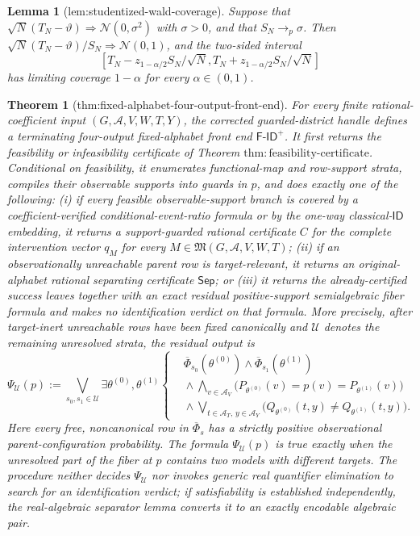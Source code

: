 \documentclass{article}
\newtheorem{theorem}{Theorem}
\newtheorem{lemma}{Lemma}
\begin{document}
\begin{lemma}[lem:studentized-wald-coverage]\label{lem:studentized-wald-coverage}
Suppose that
\(\sqrt N(T_N-\vartheta)\Rightarrow\mathcal N(0,\sigma^2)\) with
\(\sigma>0\), and that \(S_N\to_p\sigma\).  Then
\(\sqrt N(T_N-\vartheta)/S_N\Rightarrow\mathcal N(0,1)\), and the
two-sided interval
\[
\left[T_N-z_{1-\alpha/2}S_N/\sqrt N,
T_N+z_{1-\alpha/2}S_N/\sqrt N\right]
\]
has limiting coverage \(1-\alpha\) for every \(\alpha\in(0,1)\).
\end{lemma}

\begin{theorem}[thm:fixed-alphabet-four-output-front-end]\label{thm:fixed-alphabet-four-output-front-end}
For every finite rational-coefficient input \((G,\mathcal A,V,W,T,Y)\), the corrected guarded-district handle defines a terminating four-output fixed-alphabet front end \(\mathsf{F\text{-}ID}^{+}\). It first returns the feasibility or infeasibility certificate of Theorem \(\mathrm{thm:feasibility\text{-}certificate}\). Conditional on feasibility, it enumerates functional-map and row-support strata, compiles their observable supports into guards in \(p\), and does exactly one of the following: (i) if every feasible observable-support branch is covered by a coefficient-verified conditional-event-ratio formula or by the one-way classical-\(\mathsf{ID}\) embedding, it returns a support-guarded rational certificate \(C\) for the complete intervention vector \(q_M\) for every \(M\in\mathfrak M(G,\mathcal A,V,W,T)\); (ii) if an observationally unreachable parent row is target-relevant, it returns an original-alphabet rational separating certificate \(\mathsf{Sep}\); or (iii) it returns the already-certified success leaves together with an exact residual positive-support semialgebraic fiber formula and makes no identification verdict on that formula. More precisely, after target-inert unreachable rows have been fixed canonically and \(\mathcal U\) denotes the remaining unresolved strata, the residual output is
\[
 \Psi_{\mathcal U}(p)
 :=
 \bigvee_{s_0,s_1\in\mathcal U}
 \exists\theta^{(0)},\theta^{(1)}
 \left\{
 \begin{aligned}
 &\overline\Phi_{s_0}(\theta^{(0)})\wedge
   \overline\Phi_{s_1}(\theta^{(1)})\\
 &{}\wedge\bigwedge_{v\in\mathcal A_V}
   \bigl(P_{\theta^{(0)}}(v)=p(v)=P_{\theta^{(1)}}(v)\bigr)\\
 &{}\wedge\bigvee_{t\in\mathcal A_T,\,y\in\mathcal A_Y}
   \bigl(Q_{\theta^{(0)}}(t,y)\ne Q_{\theta^{(1)}}(t,y)\bigr).
 \end{aligned}
 \right.
\]
Here every free, noncanonical row in \(\overline\Phi_s\) has a strictly positive observational parent-configuration probability. The formula \(\Psi_{\mathcal U}(p)\) is true exactly when the unresolved part of the fiber at \(p\) contains two models with different targets. The procedure neither decides \(\Psi_{\mathcal U}\) nor invokes generic real quantifier elimination to search for an identification verdict; if satisfiability is established independently, the real-algebraic separator lemma converts it to an exactly encodable algebraic pair.


\end{theorem}
\end{document}
